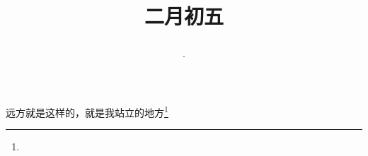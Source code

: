 \title{\date[d=14,m=3,y=2024][year:cn-y,年,month:cn,day:cn,日,·,weekday]·二月初五 }
远方就是这样的，就是我站立的地方\footnote{ }

